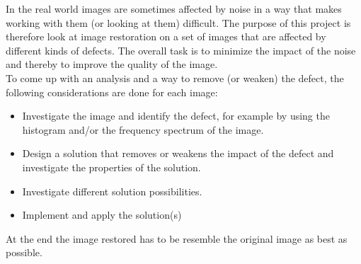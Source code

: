 In the real world images are sometimes affected by noise in a way that makes working with them (or looking at them) difficult. The purpose of this project is therefore look at image restoration on a set of images that are affected by different kinds of defects. The overall task is to minimize the impact of the noise and thereby to improve the quality of the image.\\[0.2cm]
To come up with an analysis and a way to remove (or weaken) the defect, the following considerations are done for each image: 
\begin{itemize}\itemsep-3pt
\item Investigate the image and identify the defect, for example by using the histogram and/or the frequency spectrum of the image.
\item Design a solution that removes or weakens the impact of the defect and investigate the properties of the solution. 
\item Investigate different solution possibilities.
\item Implement and apply the solution(s)
\end{itemize}

At the end the image restored has to be resemble the original image as best as possible. 

